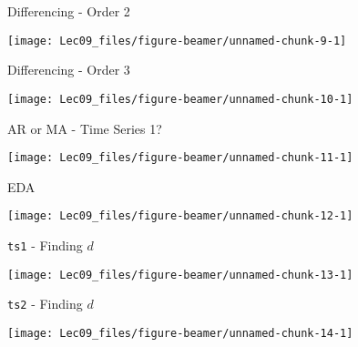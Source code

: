 \documentclass[11pt,ignorenonframetext,]{beamer}
\begin{document}
\begin{frame}{Differencing - Order 2}
\protect\hypertarget{differencing---order-2}{}

\begin{center}\texttt{[image: Lec09\_files/figure-beamer/unnamed-chunk-9-1]} \end{center}

\end{frame}

\begin{frame}{Differencing - Order 3}
\protect\hypertarget{differencing---order-3}{}

\begin{center}\texttt{[image: Lec09\_files/figure-beamer/unnamed-chunk-10-1]} \end{center}

\end{frame}

\begin{frame}{AR or MA - Time Series 1?}
\protect\hypertarget{ar-or-ma---time-series-1}{}

\begin{center}\texttt{[image: Lec09\_files/figure-beamer/unnamed-chunk-11-1]} \end{center}

\end{frame}

\begin{frame}{EDA}
\protect\hypertarget{eda-1}{}

\begin{center}\texttt{[image: Lec09\_files/figure-beamer/unnamed-chunk-12-1]} \end{center}

\end{frame}

\begin{frame}{\texttt{ts1} - Finding \(d\)}
\protect\hypertarget{ts1---finding-d}{}

\begin{center}\texttt{[image: Lec09\_files/figure-beamer/unnamed-chunk-13-1]} \end{center}

\end{frame}

\begin{frame}{\texttt{ts2} - Finding \(d\)}
\protect\hypertarget{ts2---finding-d}{}

\begin{center}\texttt{[image: Lec09\_files/figure-beamer/unnamed-chunk-14-1]} \end{center}

\end{frame}
\end{document}
